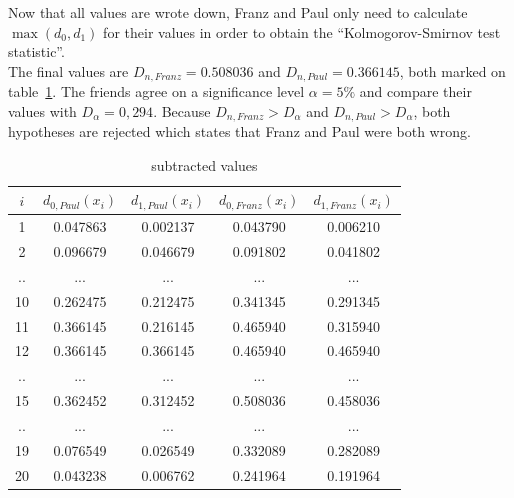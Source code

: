 \documentclass{article}
\begin{document}
Now that all values are wrote down, Franz and Paul only need to calculate $\max(d_0,d_1)$ for their values in order to obtain the ``Kolmogorov-Smirnov test statistic''.\\
The final values are $D_{n,Franz}=0.508036$ and $D_{n,Paul}=0.366145$, both marked on table~\ref{tab:2}.
The friends agree on a significance level $\alpha = 5\%$ and compare their values with $D_\alpha=0,294$. Because $D_{n,Franz}>D_\alpha$ and $D_{n,Paul}>D_\alpha$, both hypotheses are rejected which states that Franz and Paul were both wrong.
\begin{table}[ht]
\caption{subtracted values}
\center
\begin{tabular}{c|c|c|c|c}
\label{tab:2}
$i$ 	& $d_{0,Paul}(x_i)$ 	& $d_{1,Paul}(x_i)$ 	& $d_{0,Franz}(x_i)$ 	& $d_{1,Franz}(x_i)$ 	\\
\hline
1	&	0.047863	&	0.002137	&	0.043790	&	0.006210	\\
2	&	0.096679	&	0.046679	&	0.091802	&	0.041802	\\
..	&	...		&	...		&	...		&	...		\\
10	&	0.262475	&	0.212475	&	0.341345	&	0.291345	\\
11	&	0.366145	&	0.216145	&	0.465940	&	0.315940	\\
12	&\cellcolor[gray]{0.9}	0.366145	&	0.366145	&	0.465940	&	0.465940	\\
..	&	...		&	...		&	...		&	...		\\
15	&	0.362452	&	0.312452	&\cellcolor[gray]{0.9}	0.508036	&	0.458036	\\
..	&	...		&	...		&	...		&	...		\\
19	&	0.076549	&	0.026549	&	0.332089	&	0.282089	\\
20	&	0.043238	&	0.006762	&	0.241964	&	0.191964	\\
\end{tabular}
\end{table}
\end{document}
